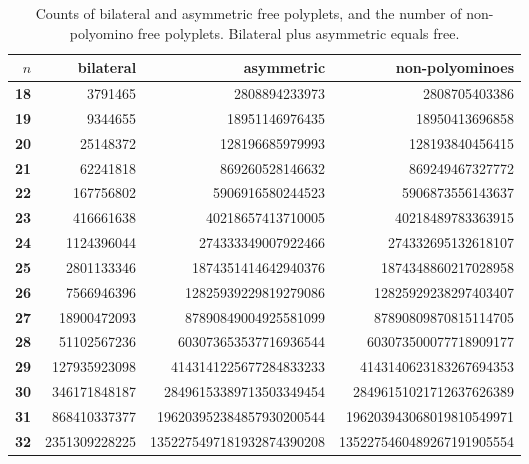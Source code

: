 \documentclass[11pt]{article}
\begin{document}
\begin{table}[htbp]
\centering\small
\begin{tabular}{r | r r r}
\toprule
$n$         &           bilateral &                      asymmetric &                 non-polyominoes\\
\midrule
\textbf{18} &       \num{3791465} &             \num{2808894233973} &             \num{2808705403386}\\
\textbf{19} &       \num{9344655} &            \num{18951146976435} &            \num{18950413696858}\\
\textbf{20} &      \num{25148372} &           \num{128196685979993} &           \num{128193840456415}\\
\textbf{21} &      \num{62241818} &           \num{869260528146632} &           \num{869249467327772}\\
\textbf{22} &     \num{167756802} &          \num{5906916580244523} &          \num{5906873556143637}\\
\textbf{23} &     \num{416661638} &         \num{40218657413710005} &         \num{40218489783363915}\\
\textbf{24} &    \num{1124396044} &        \num{274333349007922466} &        \num{274332695132618107}\\
\textbf{25} &    \num{2801133346} &       \num{1874351414642940376} &       \num{1874348860217028958}\\
\textbf{26} &    \num{7566946396} &      \num{12825939229819279086} &      \num{12825929238297403407}\\
\textbf{27} &   \num{18900472093} &      \num{87890849004925581099} &      \num{87890809870815114705}\\
\textbf{28} &   \num{51102567236} &     \num{603073653537716936544} &     \num{603073500077718909177}\\
\textbf{29} &  \num{127935923098} &    \num{4143141225677284833233} &    \num{4143140623183267694353}\\
\textbf{30} &  \num{346171848187} &   \num{28496153389713503349454} &   \num{28496151021712637626389}\\
\textbf{31} &  \num{868410337377} &  \num{196203952384857930200544} &  \num{196203943068019810549971}\\
\textbf{32} & \num{2351309228225} & \num{1352275497181932874390208} & \num{1352275460489267191905554}\\
\bottomrule
\end{tabular}
\caption{Counts of bilateral and asymmetric free polyplets, and the number of
non-polyomino free polyplets. Bilateral plus asymmetric equals free.}
\label{tab:bisym}
\end{table}
\end{document}
